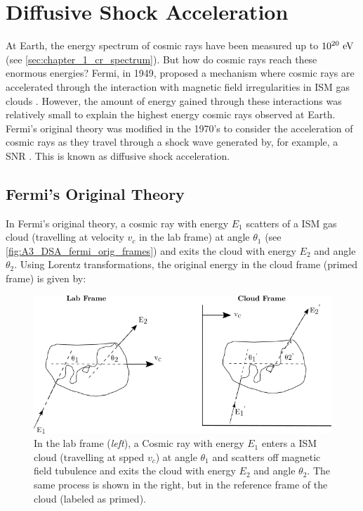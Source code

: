 \chapter{Diffusive Shock Acceleration} \label{A3_DSA}

At Earth, the energy spectrum of cosmic rays have been measured up to $10^{20}~\si{\electronvolt}$ (see \autoref{sec:chapter_1_cr_spectrum}). But how do cosmic rays reach these enormous energies? Fermi, in 1949, proposed a mechanism where cosmic rays are accelerated through the interaction with magnetic field irregularities in ISM gas clouds \citep{1949PhRv...75.1169F}. However, the amount of energy gained through these interactions was relatively small to explain the highest energy cosmic rays observed at Earth. Fermi's original theory was modified in the 1970's to consider the acceleration of cosmic rays as they travel through a shock wave generated by, for example, a SNR \citep{1977DoSSR.234.1306K,1977ICRC...11..132A,1978MNRAS.182..147B,1978MNRAS.182..443B,1978ApJ...221L..29B}. This is known as diffusive shock acceleration.

\section{Fermi's Original Theory}

In Fermi's original theory, a cosmic ray with energy $E_1$  scatters of a ISM gas cloud (travelling at velocity $v_c$ in the lab frame) at angle $\theta_1$ (see \autoref{fig:A3_DSA_fermi_orig_frames}) and exits the cloud with energy $E_2$ and angle $\theta_2$. Using Lorentz transformations, the original energy in the cloud frame (primed frame) is given by:

\begin{figure}
    \centering
    \includegraphics{A3_Diffusive_Shock_Acceleration/Images/fermi_original_theory_frames.png}
    \caption{In the lab frame (\textit{left}), a Cosmic ray with energy $E_1$ enters a ISM cloud (travelling at spped $v_c$) at angle $\theta_1$ and scatters off magnetic field tubulence and exits the cloud with energy $E_2$ and angle $\theta_2$. The same process is shown in the right, but in the reference frame of the cloud (labeled as primed).}
    \label{fig:A3_DSA_fermi_orig_frames}
\end{figure}

